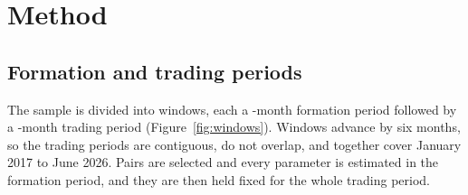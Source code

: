 \documentclass[11pt]{article}
\begin{document}
\section{Method}\label{sec:method}

\subsection{Formation and trading periods}

The sample is divided into \NWindows{} windows, each a \FormMonths-month formation
period followed by a \TradeMonths-month trading period (Figure~\ref{fig:windows}).
Windows advance by six months, so the trading periods are contiguous, do not
overlap, and together cover January 2017 to June 2026. Pairs are selected and every
parameter is estimated in the formation period, and they are then held fixed for
the whole trading period.
\end{document}
